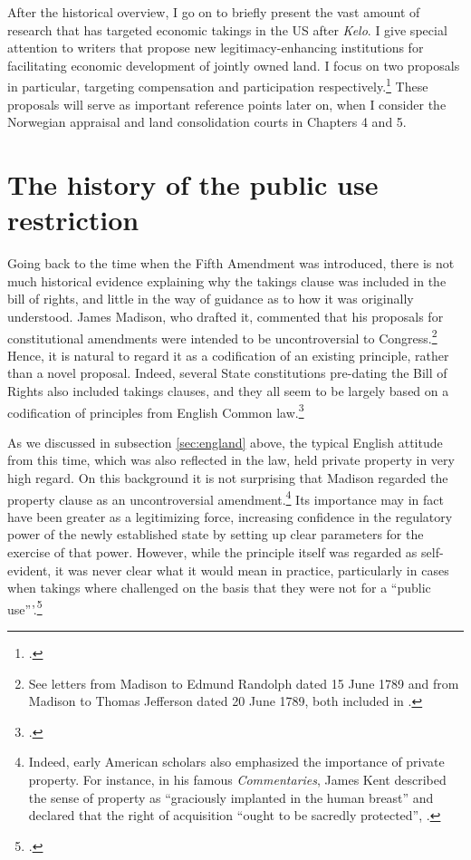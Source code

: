 \documentclass[12pt,a4paper]{book} %
\begin{document}
After the historical overview, I go on to briefly present the vast amount of research that has targeted economic takings in the US after {\it Kelo}. I give special attention to writers that propose new legitimacy-enhancing institutions for facilitating economic development of jointly owned land. I focus on two proposals in particular, targeting compensation and participation respectively.\footcite{lehavi07,heller08} These proposals will serve as important reference points later on, when I consider the Norwegian appraisal  and land consolidation courts in Chapters 4 and 5.

\section{The history of the public use restriction}\label{sec:hop}

Going back to the time when the Fifth Amendment was introduced, there is not much historical evidence explaining why the takings clause was included in the bill of rights, and little in the way of guidance as to how it was originally understood. James Madison, who drafted it, commented that his proposals for constitutional amendments were intended to be uncontroversial to Congress.\footnote{See letters from Madison to Edmund Randolph dated 15 June 1789 and from Madison to Thomas Jefferson dated 20 June 1789, both included in \cite{madison79}.}  Hence, it is natural to regard it as a codification of an existing principle, rather than a novel proposal. Indeed, several State constitutions pre-dating the Bill of Rights also included takings clauses, and they all seem to be largely based on a codification of principles from English Common law.\footcite[See][299]{johnson11}

As we discussed in subsection \ref{sec:england} above, the typical English attitude from this time, which was also reflected in the law, held private property in very high regard. On this background it is not surprising that Madison regarded the property clause as an uncontroversial amendment.\footnote{Indeed, early American scholars also emphasized the importance of private property. For instance, in his famous {\it Commentaries}, James Kent described the sense of property as ``graciously implanted in the human breast'' and declared that the right of acquisition ``ought to be sacredly protected'', \cite[see][257]{kent27}.} Its importance may in fact have been greater as a legitimizing force, increasing confidence in the regulatory power of the newly established state by setting up clear parameters for the exercise of that power.  However, while the principle itself was regarded as self-evident, it was never clear what it would mean in practice, particularly in cases when takings where challenged on the basis that they were not for a ``public use'''.\footcite[See][317]{johnson11} 
\end{document}
